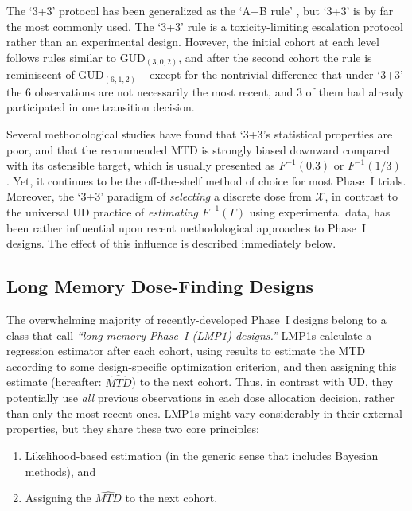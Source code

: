 The `3+3' protocol has been generalized as the `A+B rule' \citep{Lin:Shih:stat:2001}, but `3+3' is by far the most commonly used. The `3+3' rule is a toxicity-limiting escalation protocol rather than an experimental design. However, the initial cohort at each level follows rules similar to GUD$_{(3,0,2)}$, and after the second cohort the rule is reminiscent of GUD$_{(6,1,2)}$ -- except for the nontrivial difference that under `3+3' the 6 observations are not necessarily the most recent, and 3 of them had already participated in one transition decision.

Several methodological studies have found that `3+3's statistical properties are poor, and that the recommended MTD is strongly biased downward compared with its ostensible target, which is usually presented as $F^{-1}(0.3)$ or $F^{-1}(1/3)$ \citep{Rein:Paol:O'Qu:oper:1999,Lin:Shih:stat:2001}. Yet, it continues to be the off-the-shelf method of choice for most Phase~I trials. Moreover, the `3+3' paradigm of \emph{selecting} a discrete dose from $\mathcal{X}$, in contrast to the universal UD practice of \emph{estimating} $F^{-1}(\Gamma)$ using experimental data, has been rather influential upon recent methodological approaches to Phase~I designs. The effect of this influence is described immediately below.

\subsection{Long Memory Dose-Finding Designs}

The overwhelming majority of recently-developed Phase~I designs belong to a class that \cite{Oron:Hoff:smal:2013} call \emph{``long-memory Phase~I (LMP1) designs.''} LMP1s calculate a regression estimator after each cohort, using results to estimate the MTD according to some design-specific optimization criterion, and then assigning this estimate (hereafter: $\widehat{MTD}$) to the next cohort. Thus, in contrast with UD, they potentially use \emph{all} previous observations in each dose allocation decision, rather than only the most recent ones. LMP1s might vary considerably in their external properties, but they share these two core principles:
\begin{enumerate}
\item Likelihood-based estimation (in the generic sense that includes Bayesian methods), and
\item Assigning the $\widehat{MTD}$ to the next cohort.
\end{enumerate}

